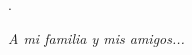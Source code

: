 \tiny{.}

\vspace{10cm}

\normalsize{}

\begin{flushright}
	\textit{A mi familia y mis amigos...}
\end{flushright}



